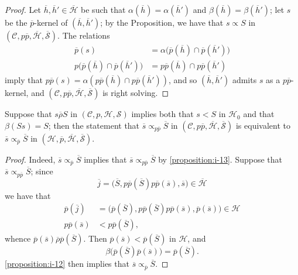 \documentclass[a4paper,fleqn]{article}
\theoremstyle{plain}
\newenvironment{corollary}[1]
  {\renewcommand\theinnercorollary{#1}\innercorollary}
  {\endinnercorollary}
\theoremstyle{definition}
\newcommand{\oldpage}[1]{{\marginpar{\footnotesize$\bigg\vert$\,\,\,\,\textit{p.~#1}}}}
\newcommand{\CC}{\mathcal{C}}
\newcommand{\HH}{\mathcal{H}}
\newcommand{\bHH}{\overline{\HH}}
\renewcommand{\SS}{\mathcal{S}}
\newcommand{\bSS}{\overline{\SS}}
\newcommand{\relrhobar}{\mathrel{\overline{\rho}}}
\newcommand{\subs}{\mathrel{\propto}}
\begin{document}
\begin{proof}
  Let $\overline{h},\overline{h}'\in\bHH$ be such that $\alpha(\overline{h})=\alpha(\overline{h}')$ and $\beta(\overline{h})=\beta(\overline{h}')$;
  let $s$ be the $\overline{p}$-kernel of $(\overline{h},\overline{h}')$;
  by the Proposition, we have that $s\subs S$ in $(\CC,p\overline{p},\bHH,\bSS)$.
  The relations
  \[
    \begin{aligned}
      \overline{p}(s)
      &= \alpha\big(\overline{p}(\overline{h})\cap\overline{p}(\overline{h}')\big)
    \\p\big(\overline{p}(\overline{h})\cap\overline{p}(\overline{h}')\big)
      &= p\overline{p}(\overline{h})\cap p\overline{p}(\overline{h}')
    \end{aligned}
  \]
  imply that $p\overline{p}(s)=\alpha(p\overline{p}(\overline{h})\cap p\overline{p}(\overline{h}'))$, and so $(\overline{h},\overline{h}')$ admits $s$ as a $p\overline{p}$-kernel, and $(\CC,p\overline{p},\bHH,\bSS)$ is right solving.
\end{proof}

\begin{corollary}{4}
  Suppose that $s\relrhobar S$ in $(\CC,p,\HH,\SS)$ implies both that $s<S$ in $\HH_0$ and that $\beta(Ss)=S$;
  then the statement that $\overline{s}\subs_{p\overline{p}}\overline{S}$ in $(\CC,p\overline{p},\bHH,\bSS)$ is equivalent to $\overline{s}\subs_{\overline{p}}\overline{S}$ in $(\HH,\overline{p},\bHH,\bSS)$.
\end{corollary}

\oldpage{376}
\begin{proof}
  Indeed, $\overline{s}\subs_{\overline{p}}\overline{S}$ implies that $\overline{s}\subs_{p\overline{p}}\overline{S}$ by \cref{proposition:i-13}.
  Suppose that $\overline{s}\subs_{p\overline{p}}\overline{S}$;
  since
  \[
    \overline{j}
    = \big(
      \overline{S}, p\overline{p}(\overline{S})p\overline{p}(\overline{s}), \overline{s}
    \big)
    \in \bHH
  \]
  we have that
  \[
    \begin{aligned}
      \overline{p}(\overline{j})
      &= \big(
        \overline{p}(\overline{S}), p\overline{p}(\overline{S})p\overline{p}(\overline{s}), \overline{p}(\overline{s})
      \big)
      \in\HH
    \\p\overline{p}(\overline{s})
      &< p\overline{p}(\overline{S}),
    \end{aligned}
  \]
  whence $\overline{p}(\overline{s})\relrhobar\overline{p}(\overline{S})$.
  Then $\overline{p}(\overline{s})<\overline{p}(\overline{S})$ in $\HH$, and
  \[
    \beta\big(
      \overline{p}(\overline{S})\overline{p}(\overline{s})
    \big)
    = \overline{p}(\overline{S}).
  \]
  \cref{proposition:i-12} then implies that $\overline{s}\subs_{\overline{p}}\overline{S}$.
\end{proof}
\end{document}
